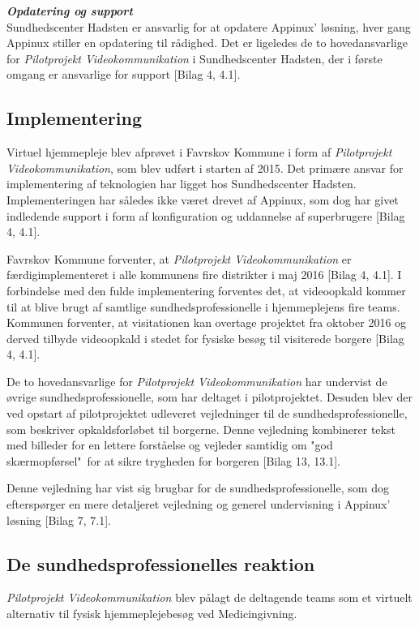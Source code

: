 \textit{\textbf{Opdatering og support}}\\
Sundhedscenter Hadsten er ansvarlig for at opdatere Appinux' løsning, hver gang Appinux stiller en opdatering til rådighed. 
Det er ligeledes de to hovedansvarlige for \textit{Pilotprojekt Videokommunikation} i Sundhedscenter Hadsten, der i første omgang er ansvarlige for support [Bilag 4, 4.1]. 

\subsection{Implementering}
Virtuel hjemmepleje blev afprøvet i Favrskov Kommune i form af \textit{Pilotprojekt Videokommunikation}, som blev udført i starten af 2015. Det primære ansvar for implementering af teknologien har ligget hos Sundhedscenter Hadsten. Implementeringen har således ikke været drevet af Appinux, som dog har givet indledende support i form af konfiguration og uddannelse af superbrugere [Bilag 4, 4.1].

Favrskov Kommune forventer, at \textit{Pilotprojekt Videokommunikation} er færdigimplementeret i alle kommunens fire distrikter i maj 2016 [Bilag 4, 4.1]. I forbindelse med den fulde implementering forventes det, at videoopkald kommer til at blive brugt af samtlige sundhedsprofessionelle i hjemmeplejens fire teams. Kommunen forventer, at visitationen kan overtage projektet fra oktober 2016 og derved tilbyde videoopkald i stedet for fysiske besøg til visiterede borgere [Bilag 4, 4.1].

De to hovedansvarlige for \textit{Pilotprojekt Videokommunikation} har undervist de øvrige sundhedsprofessionelle, som har deltaget i pilotprojektet. Desuden blev der ved opstart af pilotprojektet udleveret vejledninger til de sundhedsprofessionelle, som beskriver opkaldsforløbet til borgerne. Denne vejledning kombinerer tekst med billeder for en lettere forståelse og vejleder samtidig om "god skærmopførsel"\ for at sikre trygheden for borgeren [Bilag 13, 13.1].  

Denne vejledning har vist sig brugbar for de sundhedsprofessionelle, som dog efterspørger en mere detaljeret vejledning og generel undervisning i Appinux' løsning [Bilag 7, 7.1].

 
\subsection{De sundhedsprofessionelles reaktion}
\textit{Pilotprojekt Videokommunikation} blev pålagt de deltagende teams som et virtuelt alternativ til fysisk hjemmeplejebesøg ved Medicingivning. 

